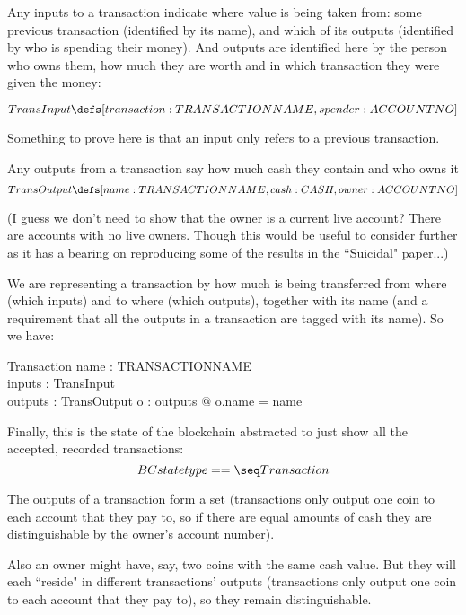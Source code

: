 \documentclass[11pt]{amsart}
\begin{document}

Any inputs to a transaction indicate where value is being taken from: some previous
 transaction (identified by its name), and which of its outputs (identified by who is spending their money). And outputs are identified here by the person who owns them, how much they are worth and in which transaction they were given the money:
 

 \[
  TransInput \defs [transaction : TRANSACTIONNAME, spender : ACCOUNTNO]
\]


Something to prove here is that an input only refers to a previous transaction.

Any outputs from a transaction say how much cash they contain and who owns it
\[
  TransOutput \defs [name : TRANSACTIONNAME, cash : CASH, owner : ACCOUNTNO]
 \]
 
(I guess we don't need to show that the owner is a current live account? There are accounts with no live owners. Though this would be useful to consider further as it has a bearing on reproducing some of the results in the ``Suicidal" paper...)
                       
 We are representing a transaction by how much is being transferred from where (which inputs)
 and to where (which outputs), together with its name (and a requirement that all the outputs in a transaction are tagged with its name). So we have:
 
\begin{schema}{Transaction}
name : TRANSACTIONNAME\\
inputs : \power TransInput\\
outputs : \power TransOutput
\where
\forall o : outputs @ o.name = name
\end{schema}

Finally, this is the state of the blockchain abstracted to just show all the accepted, recorded transactions:
 \[
  BCstatetype == \seq Transaction
\]

 The outputs of a transaction form a set (transactions only output one coin to each account that they pay to, so if there are equal amounts of cash they are distinguishable by the owner's account number).
 
 Also an owner might have, say, two coins with the same cash value. But they will each ``reside" in different transactions' outputs (transactions only output one coin to each account that they pay to), so they remain distinguishable. 
 
\end{document}
